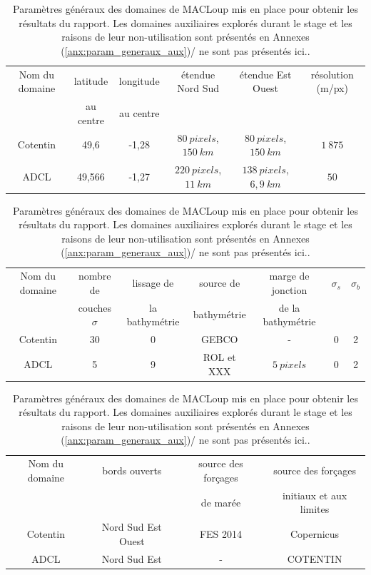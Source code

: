 \documentclass[10pt,a4paper,titlepage]{article}
\begin{document}
\begin{table}[h!]
    \centering

    \begin{tabular}{||c||c|c|c|c|c|}
        \hline
        Nom du domaine & latitude & longitude & étendue Nord Sud & étendue Est Ouest & résolution (m/px)\\
        & au centre & au centre &  &  & \\
        \hline
        Cotentin & 49,6 & -1,28 & $80~pixels$, $150~km$ & $80~pixels$, $150~km$ & $1~875$\\
        ADCL & 49,566 & -1,27 & $220~pixels$, $11~km$ & $138~pixels$, $6,9~km$ & $50$\\
        \hline
    \end{tabular}\newline

    \begin{tabular}{||c||c|c|c|c|c|c|}
        \hline
        Nom du domaine & nombre de & lissage de & source de & marge de jonction & $\sigma_{s}$ & $\sigma_{b}$ \\
        & couches $\sigma$ & la bathymétrie & bathymétrie & de la bathymétrie &  & \\
        \hline
        Cotentin & 30 & 0 & GEBCO & - & 0  & 2 \\
        ADCL & 5 & 9 & ROL et XXX & $5~pixels$ & 0 & 2 \\
        \hline
    \end{tabular}\newline

    \begin{tabular}{||c||c|c|c|}
        \hline
        Nom du domaine & bords ouverts & source des forçages & source des forçages \\
        &  & de marée & initiaux et aux limites \\
        \hline
        Cotentin & Nord Sud Est Ouest & FES 2014 & Copernicus \\
        ADCL & Nord Sud Est & - & COTENTIN \\
        \hline
    \end{tabular}
    \caption{
        Paramètres généraux des domaines de MACLoup mis en place pour obtenir les résultats du rapport.
        Les domaines auxiliaires explorés durant le stage et les raisons de leur non-utilisation sont présentés en Annexes (\ref{anx:param_generaux_aux})\alert{/ ne sont pas présentés ici.}.
    }
    \label{table:param_generaux}
\end{table}
\end{document}
